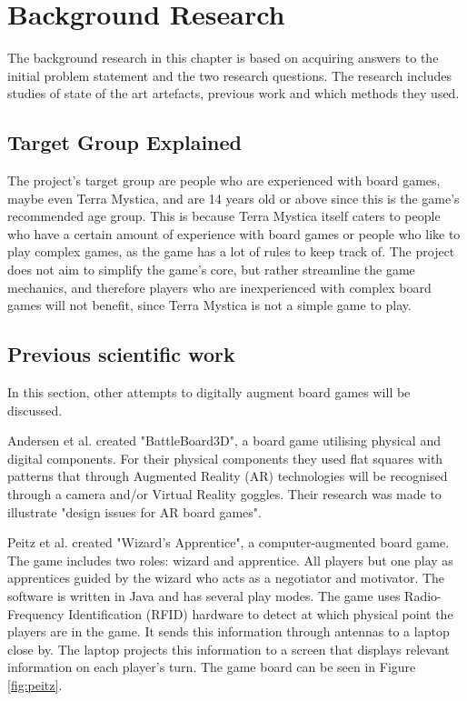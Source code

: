\chapter{Background Research}\label{ch:bgres}

The background research in this chapter is based on acquiring answers to the initial problem statement and the two research questions. The research includes studies of state of the art artefacts, previous work and which methods they used. 


\section{Target Group Explained}\label{sec:TargetGroup}
The project's target group are people who are experienced with board games, maybe even Terra Mystica, and are 14 years old or above since this is the game's recommended age group. This is because Terra Mystica itself caters to people who have a certain amount of experience with board games or people who like to play complex games, as the game has a lot of rules to keep track of. The project does not aim to simplify the game's core, but rather streamline the game mechanics, and therefore players who are inexperienced with complex board games will not benefit, since Terra Mystica is not a simple game to play.



\section{Previous scientific work}
In this section, other attempts to digitally augment board games will be discussed.

Andersen et al. \citep{andersen_designing_2004} created "BattleBoard3D", a board game utilising physical and digital components. For their physical components they used flat squares with patterns that through Augmented Reality (AR) technologies will be recognised through a camera and/or Virtual Reality goggles. Their research was made to illustrate "design issues for AR board games".

Peitz et al. \citep{peitzWizards2006} created "Wizard's Apprentice", a computer-augmented board game. The game includes two roles: wizard and apprentice. All players but one play as apprentices guided by the wizard who acts as a negotiator and motivator. The software is written in Java and has several play modes. The game uses Radio-Frequency Identification (RFID) hardware to detect at which physical point the players are in the game. It sends this information through antennas to a laptop close by. The laptop projects this information to a screen that displays relevant information on each player's turn. The game board can be seen in Figure \ref{fig:peitz}.

